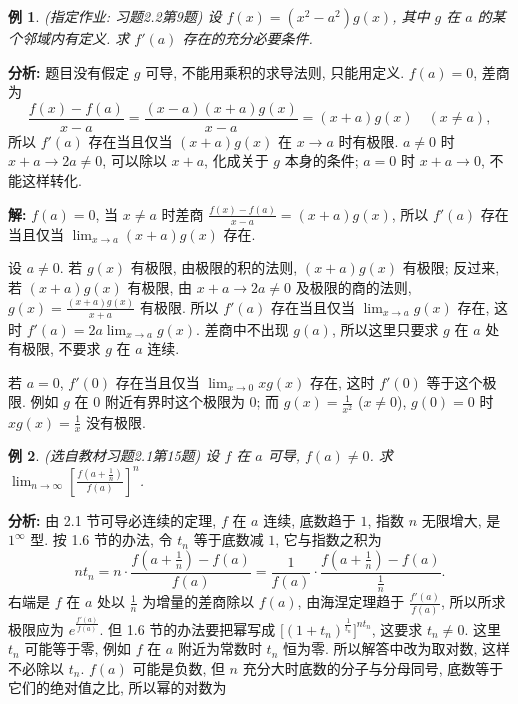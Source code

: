 \documentclass[UTF8,openany]{ctexbook}
\theoremstyle{chinesetextbook}
\newtheorem{example}{例}[section]
\newenvironment{cnsolution}{\par\indent\textbf{解:} \ignorespaces}{\par}
\begin{document}
\begin{example}\label{ex:c2-h2-9}
\textnormal{(指定作业: 习题2.2第9题)} 设 $f(x)=(x^2-a^2)g(x)$, 其中 $g$ 在 $a$ 的某个邻域内有定义. 求 $f'(a)$ 存在的充分必要条件.
\end{example}
\par\indent\textbf{分析:} 题目没有假定 $g$ 可导, 不能用乘积的求导法则, 只能用定义. $f(a)=0$, 差商为
\[
\frac{f(x)-f(a)}{x-a}=\frac{(x-a)(x+a)g(x)}{x-a}=(x+a)g(x)\quad(x\ne a),
\]
所以 $f'(a)$ 存在当且仅当 $(x+a)g(x)$ 在 $x\to a$ 时有极限. $a\ne0$ 时 $x+a\to2a\ne0$, 可以除以 $x+a$, 化成关于 $g$ 本身的条件; $a=0$ 时 $x+a\to0$, 不能这样转化.
\begin{cnsolution}
$f(a)=0$, 当 $x\ne a$ 时差商 $\displaystyle\frac{f(x)-f(a)}{x-a}=(x+a)g(x)$, 所以 $f'(a)$ 存在当且仅当 $\displaystyle\lim_{x\to a}(x+a)g(x)$ 存在.

设 $a\ne0$. 若 $g(x)$ 有极限, 由极限的积的法则, $(x+a)g(x)$ 有极限; 反过来, 若 $(x+a)g(x)$ 有极限, 由 $x+a\to2a\ne0$ 及极限的商的法则, $\displaystyle g(x)=\frac{(x+a)g(x)}{x+a}$ 有极限. 所以 $f'(a)$ 存在当且仅当 $\displaystyle\lim_{x\to a}g(x)$ 存在, 这时 $\displaystyle f'(a)=2a\lim_{x\to a}g(x)$. 差商中不出现 $g(a)$, 所以这里只要求 $g$ 在 $a$ 处有极限, 不要求 $g$ 在 $a$ 连续.

若 $a=0$, $f'(0)$ 存在当且仅当 $\displaystyle\lim_{x\to0}xg(x)$ 存在, 这时 $f'(0)$ 等于这个极限. 例如 $g$ 在 $0$ 附近有界时这个极限为 $0$; 而 $\displaystyle g(x)=\frac1{x^2}$ ($x\ne0$), $g(0)=0$ 时 $\displaystyle xg(x)=\frac1x$ 没有极限.
\end{cnsolution}
\begin{example}\label{ex:c2-h1-15}
\textnormal{(选自教材习题2.1第15题)} 设 $f$ 在 $a$ 可导, $f(a)\ne0$. 求 $\displaystyle\lim_{n\to\infty}\left[\frac{f\left(a+\frac1n\right)}{f(a)}\right]^n$.
\end{example}
\par\indent\textbf{分析:} 由 2.1 节可导必连续的定理, $f$ 在 $a$ 连续, 底数趋于 $1$, 指数 $n$ 无限增大, 是 $1^\infty$ 型. 按 1.6 节的办法, 令 $t_n$ 等于底数减 $1$, 它与指数之积为
\[
nt_n=n\cdot\frac{f\left(a+\frac1n\right)-f(a)}{f(a)}=\frac1{f(a)}\cdot\frac{f\left(a+\frac1n\right)-f(a)}{\frac1n}.
\]
右端是 $f$ 在 $a$ 处以 $\displaystyle\frac1n$ 为增量的差商除以 $f(a)$, 由海涅定理趋于 $\displaystyle\frac{f'(a)}{f(a)}$, 所以所求极限应为 $e^{\frac{f'(a)}{f(a)}}$. 但 1.6 节的办法要把幂写成 $\bigl[(1+t_n)^{\frac1{t_n}}\bigr]^{nt_n}$, 这要求 $t_n\ne0$. 这里 $t_n$ 可能等于零, 例如 $f$ 在 $a$ 附近为常数时 $t_n$ 恒为零. 所以解答中改为取对数, 这样不必除以 $t_n$. $f(a)$ 可能是负数, 但 $n$ 充分大时底数的分子与分母同号, 底数等于它们的绝对值之比, 所以幂的对数为
\end{document}
